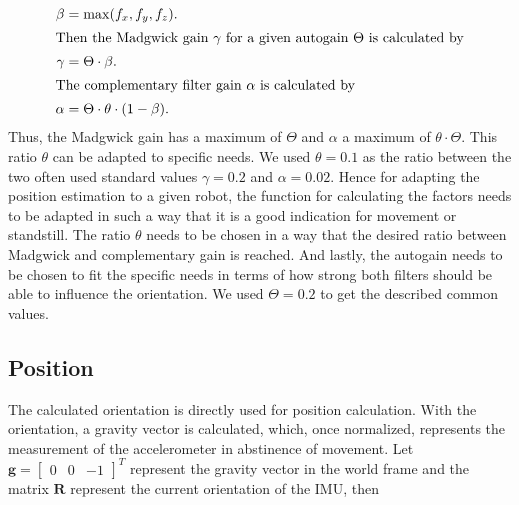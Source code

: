 \documentclass[letterpaper, 10 pt, conference]{ieeeconf}  %
\newcommand{\M}[1]{\mathbf{#1}} %
\newcommand{\V}[1]{\mathbf{#1}} %
\begin{document}
\begin{align}
\beta &= \max(f_x,f_y,f_z).\label{eq:weight_autogain}\\
\intertext{Then the Madgwick gain $\gamma$ for a given autogain $\Theta$ is calculated by} 
\gamma &= \Theta \cdot \beta. \\
\intertext{The complementary filter gain $\alpha$ is calculated by}
\alpha &= \Theta \cdot \theta \cdot(1-\beta).
\end{align}
Thus, the Madgwick gain has a maximum of $\Theta$ and $\alpha$ a maximum of $\theta\cdot \Theta$. This ratio $\theta$ can be adapted to specific needs.
We used $\theta = 0.1$ as the ratio between the two often used standard values $\gamma = 0.2$ and $\alpha= 0.02$.
Hence for adapting the position estimation to a given robot, the function for calculating the factors needs to be adapted in such a way that it is a good indication for movement or standstill.
The ratio $\theta$ needs to be chosen in a way that the desired ratio between Madgwick and complementary gain is reached.
And lastly, the autogain needs to be chosen to fit the specific needs in terms of how strong both filters should be able to influence the orientation.
We used $\Theta = 0.2$ to get the described common values.


\subsection{Position}
The calculated orientation is directly used for position calculation.
With the orientation, a gravity vector is calculated, which, once normalized, represents the measurement of the accelerometer in abstinence of movement. 
Let $\V g=\begin{bmatrix}0 &0 & -1 \end{bmatrix}^T$ represent the gravity vector in the world frame and the matrix $\M R$ represent the current orientation of the IMU, then
\end{document}
